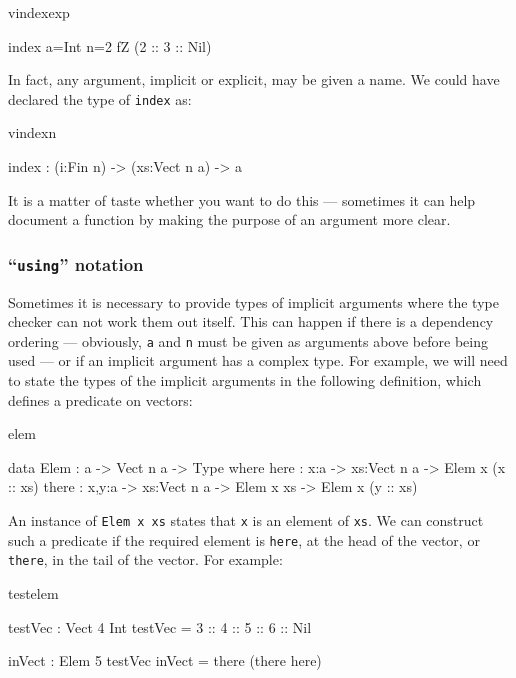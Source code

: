 \begin{SaveVerbatim}{vindexexp}

index {a=Int} {n=2} fZ (2 :: 3 :: Nil)

\end{SaveVerbatim}

\noindent
In fact, any argument, implicit or explicit, may be given a name. We could have
declared the type of \texttt{index} as:

\begin{SaveVerbatim}{vindexn}

index : (i:Fin n) -> (xs:Vect n a) -> a

\end{SaveVerbatim}

\noindent
It is a matter of taste whether you want to do this --- sometimes it can help
document a function by making the purpose of an argument more clear.

\subsubsection{``\texttt{using}'' notation}

Sometimes it is necessary to provide types of implicit arguments where
the type checker can not work them out itself. This can happen if there is a
dependency ordering --- obviously, \texttt{a} and \texttt{n} must be given as arguments above
before being used --- or if an implicit argument has a complex type. For example,
we will need to state the types of the implicit arguments in the following
definition, which defines a predicate on vectors:

\begin{SaveVerbatim}{elem}

data Elem : a -> Vect n a -> Type where
   here :  {x:a} ->   {xs:Vect n a} -> Elem x (x :: xs)
   there : {x,y:a} -> {xs:Vect n a} -> Elem x xs -> Elem x (y :: xs)

\end{SaveVerbatim}

\noindent
An instance of \texttt{Elem x xs} states that \texttt{x} is an element of 
\texttt{xs}. We can construct
such a predicate if the required element is \texttt{here}, at the head of the vector, 
or \texttt{there}, in the tail of the vector. For example:

\begin{SaveVerbatim}{testelem}

testVec : Vect 4 Int
testVec = 3 :: 4 :: 5 :: 6 :: Nil

inVect : Elem 5 testVec
inVect = there (there here)

\end{SaveVerbatim}

